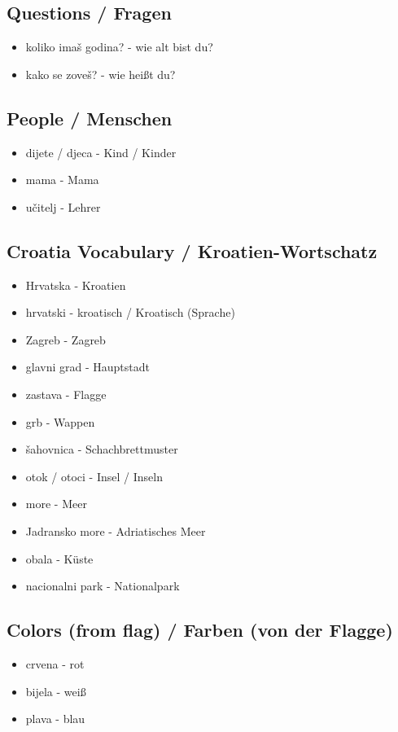 \subsection*{Questions / Fragen}
\begin{itemize}
    \item koliko imaš godina? - wie alt bist du?
    \item kako se zoveš? - wie heißt du?
\end{itemize}

\subsection*{People / Menschen}
\begin{itemize}
    \item dijete / djeca - Kind / Kinder
    \item mama - Mama
    \item učitelj - Lehrer
\end{itemize}

\subsection*{Croatia Vocabulary / Kroatien-Wortschatz}
\begin{itemize}
    \item Hrvatska - Kroatien
    \item hrvatski - kroatisch / Kroatisch (Sprache)
    \item Zagreb - Zagreb
    \item glavni grad - Hauptstadt
    \item zastava - Flagge
    \item grb - Wappen
    \item šahovnica - Schachbrettmuster
    \item otok / otoci - Insel / Inseln
    \item more - Meer
    \item Jadransko more - Adriatisches Meer
    \item obala - Küste
    \item nacionalni park - Nationalpark
\end{itemize}

\subsection*{Colors (from flag) / Farben (von der Flagge)}
\begin{itemize}
    \item crvena - rot
    \item bijela - weiß
    \item plava - blau
\end{itemize}

